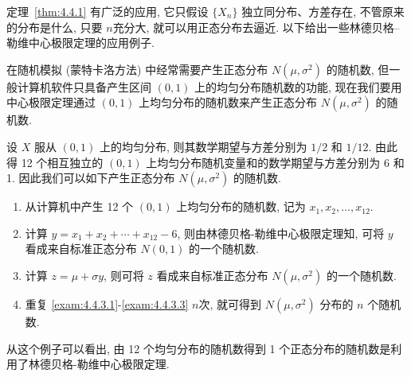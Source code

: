 定理~\ref{thm:4.4.1} 有广泛的应用, 它只假设 $ \{ X_n \} $ 独立同分布、方差存在, 不管原来的分布是什么, 只要 $ n $充分大, 就可以用正态分布去逼近.
以下给出一些林德贝格{--}勒维中心极限定理的应用例子.

\begin{example}[正态随机数的产生]\label{exam:4.4.3}
    在随机模拟 (蒙特卡洛方法) 中经常需要产生正态分布 $ N ( \mu, \sigma^2 ) $ 的随机数, 但一般计算机软件只具备产生区间 $ (0,1) $ 上的均匀分布随机数的功能, 现在我们要用中心极限定理通过 $ (0,1) $ 上均匀分布的随机数来产生正态分布 $ N ( \mu, \sigma^2 ) $ 的随机数.

    设 $ X $ 服从 $ (0,1) $ 上的均匀分布, 则其数学期望与方差分别为 $ 1/2 $ 和 $ 1/12 $.
    由此得 12 个相互独立的 $ (0,1) $ 上均匀分布随机变量和的数学期望与方差分别为 6 和1.
    因此我们可以如下产生正态分布 $ N ( \mu, \sigma^2 ) $ 的随机数.

    \begin{enumerate}
        \item\label{exam:4.4.3.1} 从计算机中产生 12 个 $ (0,1) $ 上均匀分布的随机数, 记为 $ x_1, x_2, \dotsc, x_{12} $.
        \item 计算 $ y = x_1 + x_2 + \dotsb + x_{12} - 6 $, 则由林德贝格-勒维中心极限定理知, 可将 $ y $ 看成来自标准正态分布 $ N (0,1) $ 的一个随机数.
        \item\label{exam:4.4.3.3} 计算 $z = \mu + \sigma y $, 则可将 $ z $ 看成来自标准正态分布 $ N (\mu, \sigma^2) $ 的一个随机数.
        \item 重复 \ref{exam:4.4.3.1}-\ref{exam:4.4.3.3} $n$次, 就可得到 $ N (\mu,\sigma^2 ) $ 分布的 $n$ 个随机数.
    \end{enumerate}
\end{example}

从这个例子可以看出, 由 12 个均匀分布的随机数得到 1 个正态分布的随机数是利用了林德贝格-勒维中心极限定理.

